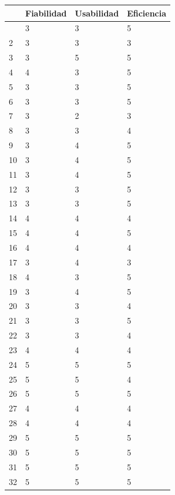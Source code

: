 \begin{center}
  \begin{longtable}{|l|l|l|l|}
    \hline
    & \textbf{Fiabilidad} & \textbf{Usabilidad} & \textbf{Eficiencia} \\
    \hline
    \endfirsthead
    \hline
    \endhead
    \endfoot
    \hline
    1 & 3 & 3 & 5 \\
    \hline
    2 & 3 & 3 & 3 \\
    \hline
    3 & 3 & 5 & 5 \\
    \hline
    4 & 4 & 3 & 5 \\
    \hline
    5 & 3 & 3 & 5 \\
    \hline
    6 & 3 & 3 & 5 \\
    \hline
    7 & 3 & 2 & 3 \\
    \hline
    8 & 3 & 3 & 4 \\
    \hline
    9 & 3 & 4 & 5 \\
    \hline
    10 & 3 & 4 & 5 \\
    \hline
    11 & 3 & 4 & 5 \\
    \hline
    12 & 3 & 3 & 5 \\
    \hline
    13 & 3 & 3 & 5 \\
    \hline
    14 & 4 & 4 & 4 \\
    \hline
    15 & 4 & 4 & 5 \\
    \hline
    16 & 4 & 4 & 4 \\
    \hline
    17 & 3 & 4 & 3 \\
    \hline
    18 & 4 & 3 & 5 \\
    \hline
    19 & 3 & 4 & 5 \\
    \hline
    20 & 3 & 3 & 4 \\
    \hline
    21 & 3 & 3 & 5 \\
    \hline
    22 & 3 & 3 & 4 \\
    \hline
    23 & 4 & 4 & 4 \\
    \hline
    24 & 5 & 5 & 5 \\
    \hline
    25 & 5 & 5 & 4 \\
    \hline
    26 & 5 & 5 & 5 \\
    \hline
    27 & 4 & 4 & 4 \\
    \hline
    28 & 4 & 4 & 4 \\
    \hline
    29 & 5 & 5 & 5 \\
    \hline
    30 & 5 & 5 & 5 \\
    \hline
    31 & 5 & 5 & 5 \\
    \hline
    32 & 5 & 5 & 5 \\

\end{longtable}
\end{center}
